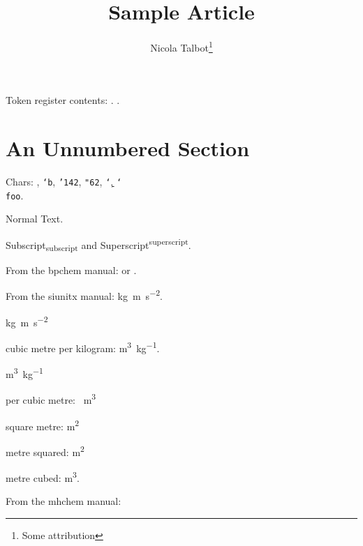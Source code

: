 \documentclass{article}
\title{Sample Article}
\author{Nicola Talbot\thanks{Some attribution}}
\begin{document}
\maketitle

\tableofcontents

\begin{abstract}
\lipsum[1]
\end{abstract}

Token register contents: \the\mytoks.
.

\section*{An Unnumbered Section}

Chars: \texttt{}, \texttt{\char`b}, \texttt{\char'142},
\texttt{\char"62}, \texttt{\char`\b}, \texttt{\char`\\ foo}.

Normal Text.
\scalebox{2}{Scaled Text}

\lipsum[4-5]

Subscript\textsubscript{subscript} and
Superscript\textsuperscript{superscript}.

From the bpchem manual:
 or .

\bpalpha \bpbeta \bpDelta
\HNMR \CNMR \cis \trans {}

From the siunitx manual:
\si{\kilo\gram\metre\per\square\second}.

\si{kg.m.s^{-2}}

cubic metre per kilogram:
\si{\cubic\metre\per\kilogram}.

\si{m^{3}.kg^{-1}}

per cubic metre: \si{\per\cubic\metre}

square metre: \si{\square\metre}

metre squared: \si{\metre\squared}

metre cubed: \si{\metre\cubed}.

From the mhchem manual:







\end{document}
